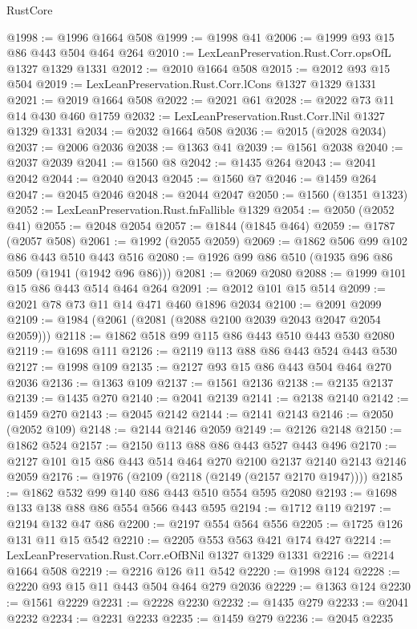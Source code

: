 \begin{lexlean}{RustCore}
\begin{coremodule}
@1998 := @1996 @1664 @508
@1999 := @1998 @41
@2006 := @1999 @93 @15 @86 @443 @504 @464 @264
@2010 := LexLeanPreservation.Rust.Corr.opsOfL @1327 @1329 @1331
@2012 := @2010 @1664 @508
@2015 := @2012 @93 @15 @504
@2019 := LexLeanPreservation.Rust.Corr.lCons @1327 @1329 @1331
@2021 := @2019 @1664 @508
@2022 := @2021 @61
@2028 := @2022 @73 @11 @14 @430 @460 @1759
@2032 := LexLeanPreservation.Rust.Corr.lNil @1327 @1329 @1331
@2034 := @2032 @1664 @508
@2036 := @2015 (@2028 @2034)
@2037 := @2006 @2036
@2038 := @1363 @41
@2039 := @1561 @2038
@2040 := @2037 @2039
@2041 := @1560 @8
@2042 := @1435 @264
@2043 := @2041 @2042
@2044 := @2040 @2043
@2045 := @1560 @7
@2046 := @1459 @264
@2047 := @2045 @2046
@2048 := @2044 @2047
@2050 := @1560 (@1351 @1323)
@2052 := LexLeanPreservation.Rust.fnFallible @1329
@2054 := @2050 (@2052 @41)
@2055 := @2048 @2054
@2057 := @1844 (@1845 @464)
@2059 := @1787 (@2057 @508)
@2061 := @1992 (@2055 @2059)
@2069 := @1862 @506 @99 @102 @86 @443 @510 @443 @516
@2080 := @1926 @99 @86 @510 (@1935 @96 @86 @509 (@1941 (@1942 @96 @86)))
@2081 := @2069 @2080
@2088 := @1999 @101 @15 @86 @443 @514 @464 @264
@2091 := @2012 @101 @15 @514
@2099 := @2021 @78 @73 @11 @14 @471 @460 @1896 @2034
@2100 := @2091 @2099
@2109 := @1984 (@2061 (@2081 (@2088 @2100 @2039 @2043 @2047 @2054 @2059)))
@2118 := @1862 @518 @99 @115 @86 @443 @510 @443 @530 @2080
@2119 := @1698 @111
@2126 := @2119 @113 @88 @86 @443 @524 @443 @530
@2127 := @1998 @109
@2135 := @2127 @93 @15 @86 @443 @504 @464 @270 @2036
@2136 := @1363 @109
@2137 := @1561 @2136
@2138 := @2135 @2137
@2139 := @1435 @270
@2140 := @2041 @2139
@2141 := @2138 @2140
@2142 := @1459 @270
@2143 := @2045 @2142
@2144 := @2141 @2143
@2146 := @2050 (@2052 @109)
@2148 := @2144 @2146 @2059
@2149 := @2126 @2148
@2150 := @1862 @524
@2157 := @2150 @113 @88 @86 @443 @527 @443 @496
@2170 := @2127 @101 @15 @86 @443 @514 @464 @270 @2100 @2137 @2140 @2143 @2146 @2059
@2176 := @1976 (@2109 (@2118 (@2149 (@2157 @2170 @1947))))
@2185 := @1862 @532 @99 @140 @86 @443 @510 @554 @595 @2080
@2193 := @1698 @133 @138 @88 @86 @554 @566 @443 @595
@2194 := @1712 @119
@2197 := @2194 @132 @47 @86
@2200 := @2197 @554 @564 @556
@2205 := @1725 @126 @131 @11 @15 @542
@2210 := @2205 @553 @563 @421 @174 @427
@2214 := LexLeanPreservation.Rust.Corr.eOfBNil @1327 @1329 @1331
@2216 := @2214 @1664 @508
@2219 := @2216 @126 @11 @542
@2220 := @1998 @124
@2228 := @2220 @93 @15 @11 @443 @504 @464 @279 @2036
@2229 := @1363 @124
@2230 := @1561 @2229
@2231 := @2228 @2230
@2232 := @1435 @279
@2233 := @2041 @2232
@2234 := @2231 @2233
@2235 := @1459 @279
@2236 := @2045 @2235

\end{coremodule}
\end{lexlean}
